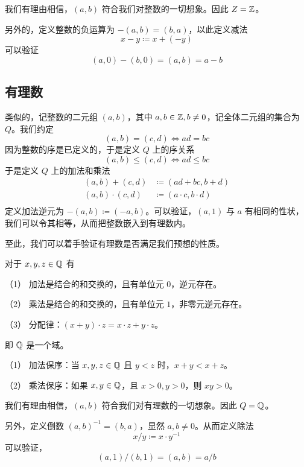 我们有理由相信，$(a,b)$ 符合我们对整数的一切想象。因此 $Z = \mathbb{Z}$。

另外的，定义整数的负运算为 $-(a,b) = (b,a)$，以此定义减法
$$x - y \coloneqq  x + (-y)$$
可以验证
$$(a,0) - (b,0) = (a,b) = a - b$$

\subsection{有理数}

类似的，记整数的二元组 $(a,b)$，其中 $a,b\in \mathbb{Z},b\ne 0$，记全体二元组的集合为 $Q$。我们约定
$$(a,b) = (c,d) \Leftrightarrow ad = bc$$
因为整数的序是已定义的，于是定义 $Q$ 上的序关系
$$(a,b) \leqslant (c,d) \Leftrightarrow ad \leqslant bc$$
于是定义 $Q$ 上的加法和乘法
\begin{equation*}
	\begin{aligned}
		(a,b) + (c,d) &\coloneqq  (ad+bc,b+d)\\
		(a,b) \cdot (c,d) &\coloneqq  (a \cdot c,b \cdot d)\\
	\end{aligned}
\end{equation*}
定义加法逆元为 $-(a,b) \coloneqq  (-a,b)$。可以验证，$(a,1)$ 与 $a$ 有相同的性状，我们可以令其相等，从而把整数嵌入到有理数内。

至此，我们可以着手验证有理数是否满足我们预想的性质。

\begin{theorem}[$\QQ$ 的代数算律]
	对于 $x,y,z\in \mathbb{Q}$ 有

	（1） 加法是结合的和交换的，且有单位元 $0$，逆元存在。

	（2） 乘法是结合的和交换的，且有单位元 $1$，非零元逆元存在。

	（3） 分配律：$(x+y) \cdot  z = x \cdot z + y\cdot z$。
\end{theorem}

即 $\QQ$ 是一个域。

\begin{theorem}[$\QQ$ 是有序域]
	（1） 加法保序：当 $x,y,z\in \mathbb{Q}$ 且 $y<z$ 时，$x+y<x+z$。

	（2） 乘法保序：如果 $x,y\in \mathbb{Q}$，且 $x>0,y>0$，则 $xy>0$。
\end{theorem}

我们有理由相信，$(a,b)$ 符合我们对有理数的一切想象。因此 $Q = \mathbb{Q}$。

另外，定义倒数 $(a,b)^{-1} = (b,a)$，显然 $a,b\ne 0$。从而定义除法
$$x/y \coloneqq  x \cdot y^{-1}$$
可以验证，
$$(a,1)/(b,1) = (a,b) = a/b$$

